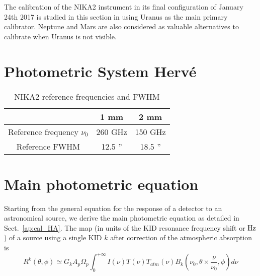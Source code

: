 %





The calibration of the NIKA2 instrument in its final configuration of
January 24th 2017 is studied in this section in using Uranus as the
main primary calibrator. Neptune and Mars are also considered as
valuable alternatives to calibrate when Uranus is not visible.

\section{Photometric System {\color{blue} Herv\'e}}
\label{se:cal_HA}

\begin{table}[h]
\begin{center}
\begin{tabular}{|c|c|c|}
\hline
     & 1 mm & 2 mm \\
\hline
Reference frequency $\nu_{0}$ & 260 GHz & 150 GHz \\
\hline
Reference FWHM                      & 12.5  '' & 18.5 '' \\
\hline
\end{tabular}
\caption{NIKA2 reference frequencies and FWHM}
\end{center}
\label{tab:definitions}
\end{table}

\section{Main photometric equation}

Starting from the general equation for the response of a detector to
an astronomical source, we derive the main photometric equation as
detailed in Sect.~\ref{ap:cal_HA}.
The map (in units of the KID resonance frequency shift or $\rm Hz$) of a source using a single KID $k$
after correction of the atmospheric absorption is
\begin{equation}
R^{k}(\theta, \phi) \simeq G_{k}  A_{p}\Omega_{p} \int_{0}^{+\infty} I(\nu)
T(\nu) T_{atm}(\nu) B_{k}(\nu_{0}, \theta \times \frac{\nu}{\nu_{0}},
\phi) d\nu 
\label{eq:mainphot}
\end{equation}

